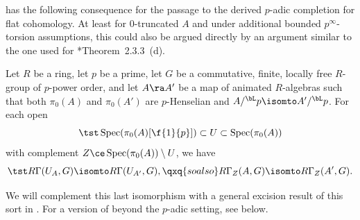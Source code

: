 

%





 has the following consequence for the passage to the derived $p$-adic completion  for flat cohomology. At least for $0$-truncated $A$ and under additional bounded $p^\infty$-torsion assumptions, this could also be argued directly by an argument similar to the one used for \cite{BC19}*{Theorem~2.3.3~(d)}.


\bcor \label{heavy-handed}
Let $R$ be a ring, let $p$ be a prime, let $G$ be a commutative, finite, locally free $R$-group of $p$-power order, and let $A \ra A'$ be a map of animated $R$-algebras such that both $\pi_0(A)$ and $\pi_0(A')$ are $p$-Henselian and $A/^\bL p\isomto A'/^\bL p$. For each open
\[
\tst \Spec(\pi_0(A)[\f{1}{p}]) \subset U \subset \Spec(\pi_0(A))
\]
with complement $Z \ce \Spec(\pi_0(A)) \setminus U$, we have 
\[
\tst R\Gamma(U_A, G) \isomto R\Gamma(U_{A'}, G), \qxq{so also} R\Gamma_Z(A, G) \isomto R\Gamma_Z(A', G).
\]
\ecor

We will complement this last isomorphism with a general excision result of this sort in . For a version of  beyond the $p$-adic setting, see  below.



